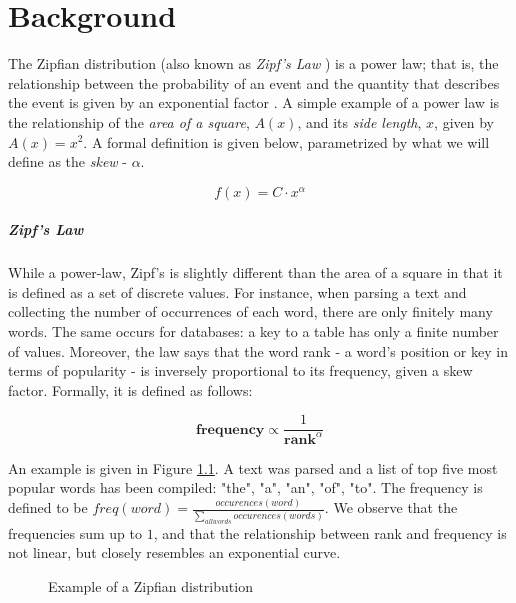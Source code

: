 \chapter{Background}\label{chapter:background}

The Zipfian distribution (also known as \textit {Zipf's Law}
 \cite{powersApplicationsExplanationsZipfs1998a}) is a power law; that is, 
 the relationship between the probability of an event and the quantity that 
 describes the event 
is given by an exponential factor \cite{newmanPowerLawsPareto2005}. A simple example of a power law is the relationship of the \textit{area of a square}, $A(x)$, and its 
\textit{side length}, $x$, given by $A(x) = x^2$. A formal definition is given below, parametrized by what we will
define as the \textit{skew} - $\alpha$.

\begin{equation}
    f(x) = C \cdot x^\alpha
    \label{eq:power-law}
\end{equation}

\paragraph{Zipf's Law} While a power-law, Zipf's is slightly different
 than the area of a square in that it is defined as a set of discrete values.
  For instance, when parsing a text and collecting the number of occurrences of 
  each word, there are only finitely many words. The same occurs for databases: a key to a table has only a finite number of values. Moreover,
 the law says that the word rank - a word's position or key in terms of popularity -
  is inversely proportional to its frequency, given a skew factor. Formally, 
  it is defined as follows:

\begin{equation}\label{eqt:zm_law}
    \textbf{frequency} \propto \frac{1}{\textbf{rank}^\alpha}
\end{equation}

An example is given in Figure \ref{fig:zipf_example}. A text was parsed and a 
list of top five most popular words has been compiled: "the", "a", "an", "of", "to".
The frequency is defined to be $freq(word) = \frac{occurences(word)}{\sum_{all words} occurences(words)}$.
 We observe that the frequencies sum up to $1$, and that the relationship
between rank and frequency is not linear, but closely resembles an exponential 
curve. 

\begin{figure}[t]
  \centering
  
  \caption{Example of a Zipfian distribution}
  \label{fig:zipf_example} 
\end{figure}

